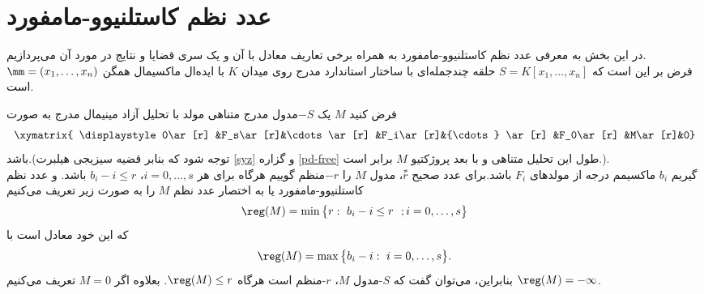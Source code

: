 \section{{عدد نظم کاستلنیوو-مامفورد}}\label{sec mumford}
در این بخش به معرفی عدد نظم کاستلنیوو-مامفورد  به همراه برخی تعاریف  معادل با آن و یک سری قضایا و نتایج در مورد آن می‌پردازیم.\\
فرض بر این است که $S=K[x_1,\ldots,x_n]$ حلقه چندجمله‌ای‌ با ساختار استاندارد مدرج روی میدان $K$ با ایده‌ال ماکسیمال همگن ${\mm}=(x_1,\ldots,x_n)$ است.
\begin{definition}\label{reg-1}
فرض کنید $M$ یک $-S$مدول مدرج متناهی مولد  با تحلیل آزاد مینیمال مدرج به صورت 
\begin{displaymath}
\xymatrix{
\displaystyle 0\ar[r] &F_s\ar[r]&\cdots\ar[r] &F_i\ar[r]&{\cdots} \ar[r] &F_0\ar[r] &M\ar[r]&0}
\end{displaymath}
باشد.(توجه شود که بنابر قضیه سیزیجی هیلبرت 
\ref{syz}
و گزاره 
\ref{pd-free}
طول این تحلیل متناهی و با بعد پروژکتیو $M$ برابر است.).
\\
گیریم $b_i$ ماکسیمم درجه از مولدهای $F_i$  باشد.برای عدد صحیح $ًr$، مدول $M$ را $-r$منظم گوییم هرگاه برای هر $i=0,\ldots,s$، 
$b_i-i \leq r$ 
باشد.
و عدد نظم کاستلنیوو-مامفورد یا به اختصار عدد نظم $M$ را به صورت زیر تعریف می‌کنیم
$$\reg(M)=\min\big \{r:~b_i-i\leq r ~~ ; i=0,\ldots,s\big\}$$
که این خود معادل است با
$$\reg(M)=\max\big \{b_i-i  :~ i=0,\ldots,s\big\}.$$
بنابراین، می‌توان گفت که $S$-مدول $M$، 
$r$-منظم
 است هرگاه $\reg(M)\leq r$.
بعلاوه  اگر $M=0$ تعریف می‌کنیم $\reg(M)=-\infty$.
\end{definition}
